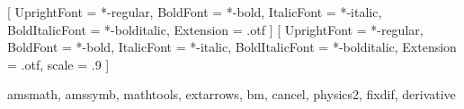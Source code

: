 \RequirePackage[zihao = -4]{ctex}
\linespread{1.39}
\setlength{\parindent}{2\ccwd}
\setmainfont{texgyretermes}
  [
    UprightFont = *-regular,
    BoldFont = *-bold,
    ItalicFont = *-italic,
    BoldItalicFont = *-bolditalic,
    Extension = .otf
  ]
\setsansfont{texgyreheros}
  [
    UprightFont = *-regular,
    BoldFont = *-bold,
    ItalicFont = *-italic,
    BoldItalicFont = *-bolditalic,
    Extension = .otf,
    scale = .9
  ]

\newcommand\semilarge
  {
    \@setfontsize\semilarge{14}{16.5}
  }

\RequirePackage
{
  amsmath, amssymb, mathtools, extarrows,
  bm, cancel, physics2, fixdif, derivative
}
\endinput